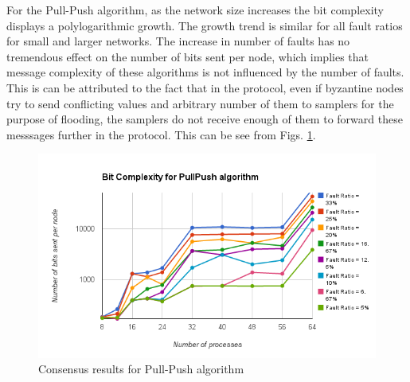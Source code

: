 For the Pull-Push algorithm, as the network size increases the bit complexity displays a polylogarithmic growth. The growth trend is similar for all fault ratios for small and larger networks. The increase in number of faults has no tremendous effect on the number of bits sent per node, which implies that message complexity of these algorithms is not influenced by the number of faults. This is can be attributed to the fact that in the protocol, even if byzantine nodes try to send conflicting values and arbitrary number of them to samplers for the purpose of flooding, the samplers do not receive enough of them to forward these messsages further in the protocol. This can be see from Figs. \ref{fig:pull_push}.
\begin{figure}[h]
 \centering
\includegraphics[scale=0.4]{pull_push}
\caption{Consensus results for Pull-Push algorithm}
 \label{fig:pull_push}
\end{figure}



